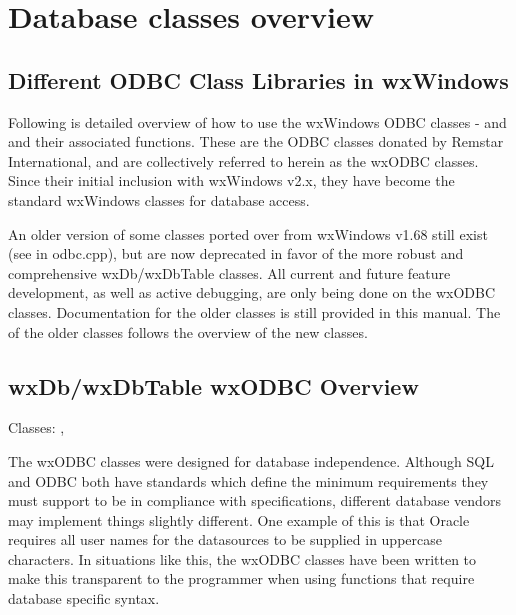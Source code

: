 \section{Database classes overview}\label{odbcoverview}


\subsection{Different ODBC Class Libraries in wxWindows}

Following is detailed overview of how to use the wxWindows ODBC classes -  
and  and their associated functions.  These are 
the ODBC classes donated by Remstar International, and are collectively 
referred to herein as the wxODBC classes.  Since their initial inclusion with 
wxWindows v2.x, they have become the standard wxWindows classes for database 
access.

An older version of some classes ported over from wxWindows v1.68 still exist 
(see  in odbc.cpp), but are now deprecated in favor of the more 
robust and comprehensive wxDb/wxDbTable classes.  All current and future 
feature development, as well as active debugging, are only being done on 
the wxODBC classes.  Documentation for the older classes is still provided 
in this manual.  The  of the 
older classes follows the overview of the new classes.

\subsection{wxDb/wxDbTable wxODBC Overview}\label{wxodbcoverview}

Classes: , 

The wxODBC classes were designed for database independence.  Although SQL and 
ODBC both have standards which define the minimum requirements they must 
support to be in compliance with specifications, different database vendors 
may implement things slightly different.  One example of this is that Oracle 
requires all user names for the datasources to be supplied in uppercase 
characters.  In situations like this, the wxODBC classes have been written 
to make this transparent to the programmer when using functions that require 
database specific syntax.

